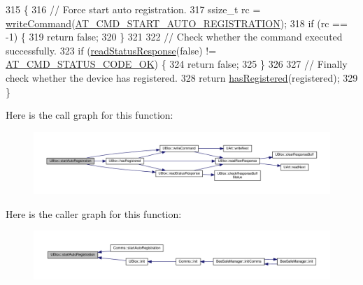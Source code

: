 \begin{DoxyCode}
315 \{
316     \textcolor{comment}{// Force start auto registration.}
317     ssize\_t rc = \hyperlink{class_u_blox_af604d1897a66192bf1c2a11997f2634d}{writeCommand}(\hyperlink{_u_blox_8cpp_a446932fdbc232c192835bf275c36ac30}{AT\_CMD\_START\_AUTO\_REGISTRATION});
318     \textcolor{keywordflow}{if} (rc == -1) \{
319         \textcolor{keywordflow}{return} \textcolor{keyword}{false};
320     \}
321 
322     \textcolor{comment}{// Check whether the command executed successfully.}
323     \textcolor{keywordflow}{if} (\hyperlink{class_u_blox_a4eaca5b1b1c4b5b6f6164b220dd43e0b}{readStatusResponse}(\textcolor{keyword}{false}) != \hyperlink{_u_blox_8cpp_a6ebc1682eb6b9964fccb4a61688ff307}{AT\_CMD\_STATUS\_CODE\_OK}) \{
324         \textcolor{keywordflow}{return} \textcolor{keyword}{false};
325     \}
326 
327     \textcolor{comment}{// Finally check whether the device has registered.}
328     \textcolor{keywordflow}{return} \hyperlink{class_u_blox_a1889c2b9bb6087bc939bd2a27b68623b}{hasRegistered}(registered);
329 \}
\end{DoxyCode}
Here is the call graph for this function\+:\nopagebreak
\begin{figure}[H]
\begin{center}
\leavevmode
\includegraphics[width=350pt]{da/df6/class_u_blox_a2e816e864ebf43743b3f6187e20c2b1f_cgraph}
\end{center}
\end{figure}
Here is the caller graph for this function\+:\nopagebreak
\begin{figure}[H]
\begin{center}
\leavevmode
\includegraphics[width=350pt]{da/df6/class_u_blox_a2e816e864ebf43743b3f6187e20c2b1f_icgraph}
\end{center}
\end{figure}
\mbox{\label{class_u_blox_af604d1897a66192bf1c2a11997f2634d}} 
